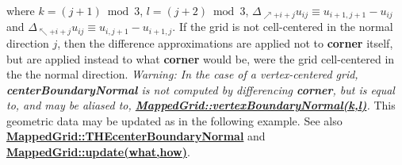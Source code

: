 \documentclass{article}
\begin{document}
    where $k=(j+1)\bmod3$, $l=(j+2)\bmod3$,
    $\Delta_{\nearrow+i+j} u_{ij} \equiv u_{i+1,j+1}-u_{ij}$ and
    $\Delta_{\nwarrow+i+j} u_{ij} \equiv u_{i,j+1}-u_{i+1,j}$.
    If the grid is not cell-centered in the normal direction $j$, then the difference approximations are applied not to \textbf{corner} itself,
    but are applied instead to what \textbf{corner} would be, were the grid cell-centered in the the normal direction.
    {\em Warning:  In the case of a vertex-centered grid, \textbf{centerBoundaryNormal} is not computed by differencing \textbf{corner},
    but is equal to, and may be aliased to, {\bf{}\hyperref{vertexBoundaryNormal}{vertexBoundaryNormal \rm(\S}{)}{MappedGrid::vertexBoundaryNormal(k,l)}}.}
    This geometric data may be updated as in the following example.
    See also {\bf{}\hyperref{THEcenterBoundaryNormal}{THEcenterBoundaryNormal \rm(\S}{)}{MappedGrid::THEcenterBoundaryNormal}}
    and {\bf{}\hyperref{update(what,how)}{update(what,how) \rm(\S}{)}{MappedGrid::update(what,how)}}.
\end{document}
